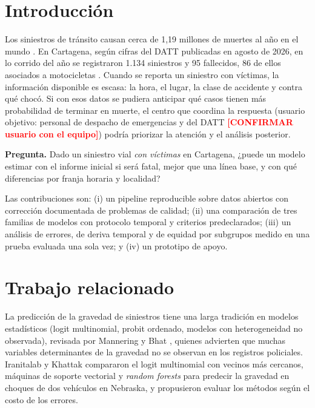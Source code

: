 \documentclass[conference]{IEEEtran}
\newcommand{\pend}[1]{\textcolor{red}{\textbf{[#1]}}}
\begin{document}
\section{Introducción}
Los siniestros de tránsito causan cerca de 1,19 millones de muertes al año en el mundo \cite{who2023road}. En Cartagena, según cifras
del DATT publicadas en agosto de 2026, en lo corrido del año se registraron 1.134 siniestros y 95 fallecidos, 86 de ellos asociados a
motocicletas \cite{eluniversal2026motos}. Cuando se reporta un siniestro con víctimas, la información disponible es escasa: la
hora, el lugar, la clase de accidente y contra qué chocó. Si con esos datos se pudiera anticipar qué casos tienen más probabilidad
de terminar en muerte, el centro que coordina la respuesta (usuario objetivo: personal de despacho de emergencias y del DATT
\pend{CONFIRMAR usuario con el equipo}) podría priorizar la atención y el análisis posterior.

\textbf{Pregunta.} Dado un siniestro vial \emph{con víctimas} en Cartagena, ¿puede un modelo estimar con el informe inicial si será
fatal, mejor que una línea base, y con qué diferencias por franja horaria y localidad?

Las contribuciones son: (i) un pipeline reproducible sobre datos abiertos con corrección documentada de problemas de calidad;
(ii) una comparación de tres familias de modelos con protocolo temporal y criterios predeclarados; (iii) un análisis de errores,
de deriva temporal y de equidad por subgrupos medido en una prueba evaluada una sola vez; y (iv) un prototipo de apoyo.

\section{Trabajo relacionado}
La predicción de la gravedad de siniestros tiene una larga tradición en modelos estadísticos (logit multinomial, probit ordenado,
modelos con heterogeneidad no observada), revisada por Mannering y Bhat \cite{mannering2014analytic}, quienes advierten que muchas
variables determinantes de la gravedad no se observan en los registros policiales. Iranitalab y Khattak \cite{iranitalab2017comparison}
compararon el logit multinomial con vecinos más cercanos, máquinas de soporte vectorial y \emph{random forests} para predecir la
gravedad en choques de dos vehículos en Nebraska, y propusieron evaluar los métodos según el costo de los errores.
\end{document}
